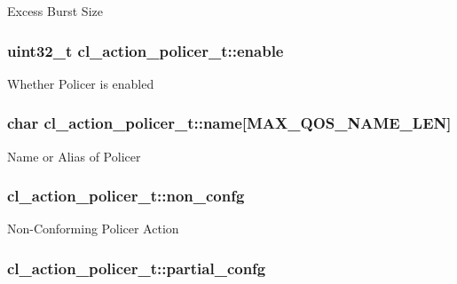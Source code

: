 Excess Burst Size \hypertarget{structcl__action__policer__t_a490e11e21624bdd2d9ff1dcbd83947b8}{
\subsubsection[{enable}]{\setlength{\rightskip}{0pt plus 5cm}uint32\-\_\-t cl\-\_\-action\-\_\-policer\-\_\-t\-::enable}}\label{structcl__action__policer__t_a490e11e21624bdd2d9ff1dcbd83947b8}
Whether Policer is enabled \hypertarget{structcl__action__policer__t_ab03e04d215ba95b54443f3dc90c9bc30}{
\subsubsection[{name}]{\setlength{\rightskip}{0pt plus 5cm}char cl\-\_\-action\-\_\-policer\-\_\-t\-::name\mbox{[}{\bf M\-A\-X\-\_\-\-Q\-O\-S\-\_\-\-N\-A\-M\-E\-\_\-\-L\-E\-N}\mbox{]}}}\label{structcl__action__policer__t_ab03e04d215ba95b54443f3dc90c9bc30}
Name or Alias of Policer \hypertarget{structcl__action__policer__t_ae50ca4ef91d3382c4ac66b5a21672f32}{
\subsubsection[{non\-\_\-confg}]{ cl\-\_\-action\-\_\-policer\-\_\-t\-::non\-\_\-confg}}\label{structcl__action__policer__t_ae50ca4ef91d3382c4ac66b5a21672f32}
Non-\/\-Conforming Policer Action \hypertarget{structcl__action__policer__t_aa54565ed3cc4df7a357337d9857f7829}{
\subsubsection[{partial\-\_\-confg}]{ cl\-\_\-action\-\_\-policer\-\_\-t\-::partial\-\_\-confg}}\label{structcl__action__policer__t_aa54565ed3cc4df7a357337d9857f7829}
